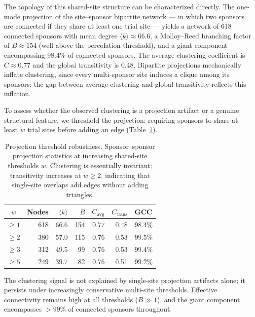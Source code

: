 \documentclass[11pt,a4paper]{article}
\begin{document}
The topology of this shared-site structure can be characterized directly. The one-mode projection of the site--sponsor bipartite network --- in which two sponsors are connected if they share at least one trial site --- yields a network of 618 connected sponsors with mean degree $\langle k \rangle \approx 66.6$, a Molloy--Reed branching factor of $B \approx 154$ (well above the percolation threshold), and a giant component encompassing 98.4\% of connected sponsors. The average clustering coefficient is $C \approx 0.77$ and the global transitivity is 0.48. Bipartite projections mechanically inflate clustering, since every multi-sponsor site induces a clique among its sponsors; the gap between average clustering and global transitivity reflects this inflation.

To assess whether the observed clustering is a projection artifact or a genuine structural feature, we threshold the projection: requiring sponsors to share at least $w$ trial sites before adding an edge (Table~\ref{tab:robustness}).

\begin{table}[h]
\centering
\small
\caption{Projection threshold robustness. Sponsor--sponsor projection statistics at increasing shared-site thresholds $w$. Clustering is essentially invariant; transitivity increases at $w \geq 2$, indicating that single-site overlaps add edges without adding triangles.}
\label{tab:robustness}
\begin{tabular}{crrrrrl}
\hline
$w$ & Nodes & $\langle k \rangle$ & $B$ & $C_{\mathrm{avg}}$ & $C_{\mathrm{trans}}$ & GCC \\
\hline
$\geq 1$ & 618 & 66.6 & 154 & 0.77 & 0.48 & 98.4\% \\
$\geq 2$ & 380 & 57.0 & 115 & 0.76 & 0.53 & 99.5\% \\
$\geq 3$ & 312 & 49.5 & 99 & 0.76 & 0.53 & 99.4\% \\
$\geq 5$ & 249 & 39.7 & 82 & 0.76 & 0.51 & 99.2\% \\
\hline
\end{tabular}
\end{table}

The clustering signal is not explained by single-site projection artifacts alone; it persists under increasingly conservative multi-site thresholds. Effective connectivity remains high at all thresholds ($B \gg 1$), and the giant component encompasses $> 99$\% of connected sponsors throughout.
\end{document}
